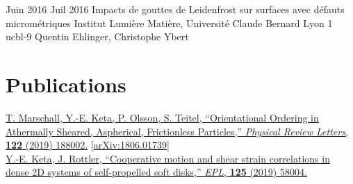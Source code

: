 \documentclass[letterpaper]{cvtemplate_fr} %
\begin{document}
\begin{cvbody}
\cvitem
	{Juin 2016}
	{Juil 2016}
	{Impacts de gouttes de Leidenfrost sur surfaces avec d\'efauts microm\'etriques}
	{Institut Lumi\`ere Mati\`ere, Universit\'e Claude Bernard Lyon 1 }
	{ucbl}{}{-9}
	{Quentin Ehlinger, Christophe Ybert}

\end{cvbody}


\section{Publications}

\parbox[t]{\textwidth}{

\href{https://doi.org/10.1103/PhysRevLett.122.188002}{T. Marschall, Y.-E. Keta, P. Olsson, S. Teitel, ``Orientational Ordering in Athermally Sheared, Aspherical, Frictionless Particles,'' \textit{Physical Review Letters}, \textbf{122} (2019) 188002.} \href{https://arxiv.org/abs/1806.01739}{[arXiv:1806.01739]}\\

\href{https://doi.org/10.1209/0295-5075/125/58004}{Y.-E. Keta, J. Rottler, ``Cooperative motion and shear strain correlations in dense 2D systems of self-propelled soft disks,'' \textit{EPL}, \textbf{125} (2019) 58004.}\\

}

\end{document}
